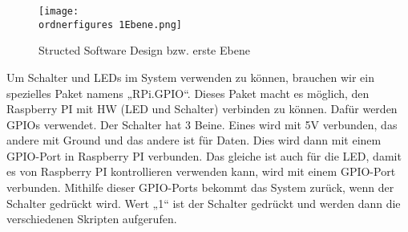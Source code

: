 \begin{figure}[H]
	\texttt{[image: \\ordnerfigures 1Ebene.png]}
	\caption{Structed Software Design bzw. erste Ebene }
	\label{fig:1Ebene_Gesichtsregistrierung}
\end{figure}
Um Schalter und LEDs im System verwenden zu k\"onnen, brauchen wir ein spezielles Paket namens „RPi.GPIO“. Dieses Paket macht es m\"oglich, den Raspberry PI mit HW (LED und Schalter) verbinden zu k\"onnen. Daf\"ur werden GPIOs verwendet. Der Schalter hat 3 Beine. Eines wird mit 5V verbunden, das andere mit Ground und das andere ist f\"ur Daten. Dies wird dann mit einem GPIO-Port in Raspberry PI verbunden. Das gleiche ist auch f\"ur die LED, damit es von Raspberry PI kontrollieren verwenden kann, wird mit einem GPIO-Port verbunden. Mithilfe dieser GPIO-Ports bekommt das System zur\"uck, wenn der Schalter gedr\"uckt wird. Wert „1“ ist der Schalter gedr\"uckt und werden dann die verschiedenen Skripten aufgerufen. 

